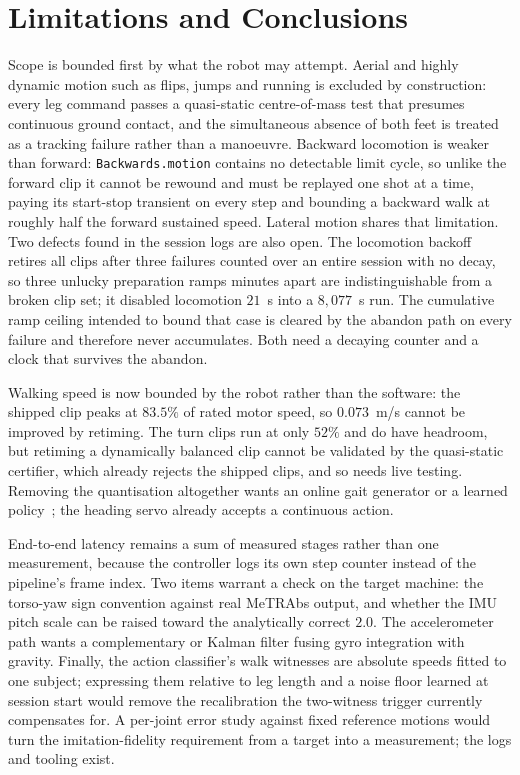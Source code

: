 \documentclass[twocolumn]{article}
\begin{document}
\section{Limitations and Conclusions}

Scope is bounded first by what the robot may attempt. Aerial and highly dynamic motion such
as flips, jumps and running is excluded by construction: every leg command passes a quasi-static
centre-of-mass test that presumes continuous ground contact, and the simultaneous absence of
both feet is treated as a tracking failure rather than a manoeuvre. Backward locomotion is
weaker than forward: \texttt{Backwards.motion} contains no detectable limit cycle, so unlike
the forward clip it cannot be rewound and must be replayed one shot at a time, paying its
start-stop transient on every step and bounding a backward walk at roughly half the forward
sustained speed. Lateral motion shares that limitation. Two defects found in the session logs
are also open. The locomotion backoff retires all clips after three failures
counted over an entire session with no decay, so three unlucky preparation ramps minutes apart
are indistinguishable from a broken clip set; it disabled locomotion $21$~s into a
$8{,}077$~s run. The cumulative ramp ceiling intended to bound that case is cleared by the
abandon path on every failure and therefore never accumulates. Both need a decaying counter and
a clock that survives the abandon.

Walking speed is now bounded by the robot rather than the software: the shipped clip peaks at
$83.5\%$ of rated motor speed, so $0.073$~m/s cannot be improved by retiming. The turn clips
run at only $52\%$ and do have headroom, but retiming a dynamically balanced clip cannot be
validated by the quasi-static certifier, which already rejects the shipped clips, and so needs
live testing. Removing the quantisation altogether wants an online gait generator or a learned
policy~\cite{ze2025twist}; the heading servo already accepts a continuous action.

End-to-end latency remains a sum of measured stages rather than one measurement, because the
controller logs its own step counter instead of the pipeline's frame index. Two items warrant a
check on the target machine: the torso-yaw sign convention against real MeTRAbs output, and
whether the IMU pitch scale can be raised toward the analytically correct $2.0$. The
accelerometer path wants a complementary or Kalman filter fusing gyro integration with gravity.
Finally, the action classifier's walk witnesses are absolute speeds fitted to one subject;
expressing them relative to leg length and a noise floor learned at session start would remove
the recalibration the two-witness trigger currently compensates for. A per-joint error study
against fixed reference motions would turn the imitation-fidelity requirement from a target
into a measurement; the logs and tooling exist.
\end{document}
